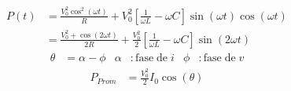 \begin{align*}
  P(t) &= \frac{V_0^2 \cos^{2}(\omega t)}{R} + V_0^2\left[\frac{1}{\omega L} - \omega C\right] \sin(\omega t) \cos(\omega t) \\
  &= \frac{V_0^2 + \cos(2 \omega t)}{2R} + \frac{V_0^2}{2} \left[\frac{1}{\omega L} - \omega C\right] \sin(2 \omega t)
\end{align*}
\begin{align*}
  \theta &= \alpha - \phi &
  \alpha &: \mathrm{fase\mspace{5mu} de\mspace{5mu}} i &
  \phi &: \mathrm{fase\mspace{5mu} de\mspace{5mu}} v
\end{align*}
\begin{align*}
  P_{Prom} &= \frac{V_0^2}{2} I_0 \cos(\theta)
\end{align*}
